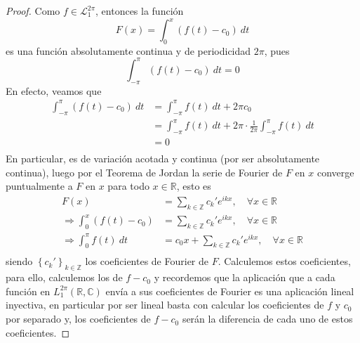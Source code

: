 \documentclass[12pt]{report}
\newcounter{it}
\theoremstyle{largebreak}
\begin{document}
    \begin{proof}
        Como $f\in\mathcal{L}_1^{2\pi}$, entonces la función
        \begin{equation*}
            F(x)=\int_{0}^{x}\left(f(t)-c_0 \right)\:dt
        \end{equation*}
        es una función absolutamente continua y de periodicidad $2\pi$, pues
        \begin{equation*}
            \int_{-\pi}^{\pi}(f(t)-c_0)\:dt=0
        \end{equation*}
        En efecto, veamos que
        \begin{equation*}
            \begin{split}
                \int_{-\pi}^{\pi}(f(t)-c_0)\:dt&=\int_{-\pi}^{\pi}f(t)\:dt+2\pi c_0\\
                &=\int_{-\pi}^{\pi}f(t)\:dt+2\pi\cdot\frac{1}{2\pi}\int_{-\pi}^{\pi}f(t)\:dt\\
                &=0\\
            \end{split}
        \end{equation*}
        En particular, es de variación acotada y continua (por ser absolutamente continua), luego por el Teorema de Jordan la serie de Fourier de $F$ en $x$ converge puntualmente a $F$ en $x$ para todo $x\in\mathbb{R}$, esto es
        \begin{equation*}
            \begin{split}
                F(x)&=\sum_{ k\in\mathbb{Z}}c_k'e^{ ikx},\quad\forall x\in\mathbb{R}\\
                \Rightarrow \int_{0}^{x}(f(t)-c_0)&=\sum_{ k\in\mathbb{Z}}c_k'e^{ ikx},\quad\forall x\in\mathbb{R}\\
                \Rightarrow \int_{0}^{\pi}f(t)\:dt&=c_0x+\sum_{ k\in\mathbb{Z}}c_k'e^{ ikx},\quad\forall x\in\mathbb{R}\\
            \end{split}
        \end{equation*}
        siendo $\left\{c_k'\right\}_{ k\in\mathbb{Z}}$ los coeficientes de Fourier de $F$. Calculemos estos coeficientes, para ello, calculemos los de $f-c_0$ y recordemos que la aplicación que a cada función en $L_1^{2\pi}(\mathbb{R},\mathbb{C})$ envía a sus coeficientes de Fourier es una aplicación lineal inyectiva, en particular por ser lineal basta con calcular los coeficientes de $f$ y $c_0$ por separado y, los coeficientes de $f-c_0$ serán la diferencia de cada uno de estos coeficientes.


\end{proof}
\end{document}

